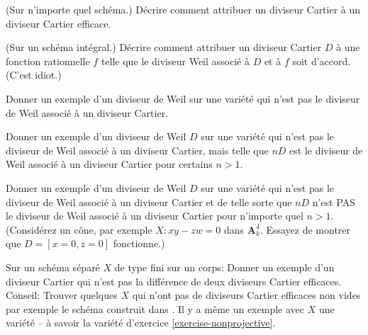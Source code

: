\begin{exercise}
\label{exercise-effective-cartier-cartier}
(Sur n'importe quel
schéma.) Décrire comment attribuer un diviseur Cartier à un diviseur Cartier efficace.
\end{exercise}

\begin{exercise}
\label{exercise-rational-function-cartier}
(Sur un schéma intégral.)
Décrire comment attribuer un diviseur Cartier $D$ à une fonction rationnelle $f$
telle que le diviseur Weil associé à $D$ et à $f$ soit
d'accord. (C'est idiot.)
\end{exercise}

\begin{exercise}
\label{exercise-weil-not-cartier}
Donner un exemple d'un diviseur de Weil sur une variété qui n'est
pas le diviseur de Weil associé à un diviseur Cartier.
\end{exercise}

\begin{exercise}
\label{exercise-weil-Q-cartier}
Donner un exemple d'un diviseur de Weil $D$ sur une variété qui n'est
pas le diviseur de Weil associé à un diviseur Cartier, mais telle
que $nD$ est le diviseur de Weil associé à un diviseur Cartier
pour certains $n > 1$.
\end{exercise}

\begin{exercise}
\label{exercise-weil-not-Q-cartier}
Donner un exemple d'un diviseur de Weil $D$ sur une variété qui n'est pas
le diviseur de Weil associé à un diviseur Cartier et de telle sorte
que $nD$ n'est PAS le diviseur de Weil associé à un diviseur Cartier pour
n'importe quel $n > 1$.
(Considérez un cône, par exemple $X : xy - zw = 0$ dans
$\mathbf{A}^4_k$. Essayez de montrer que $D = [x = 0, z = 0]$ fonctionne.)
\end{exercise}

\begin{exercise}
\label{exercise-cartier-not-difference-effective-cartier}
Sur un schéma séparé $X$ de type fini sur
un corps: Donner un exemple d'un diviseur Cartier qui n'est pas
la différence de deux diviseurs
Cartier efficaces. Conseil: Trouver quelques $X$ qui n'ont pas de diviseurs Cartier
efficaces non vides par exemple le schéma
construit dans \cite[III Exercise 5.9]{H}. Il y a même
un exemple avec $X$ une variété --
à savoir la variété d'exercice \ref{exercise-nonprojective}.
\end{exercise}

